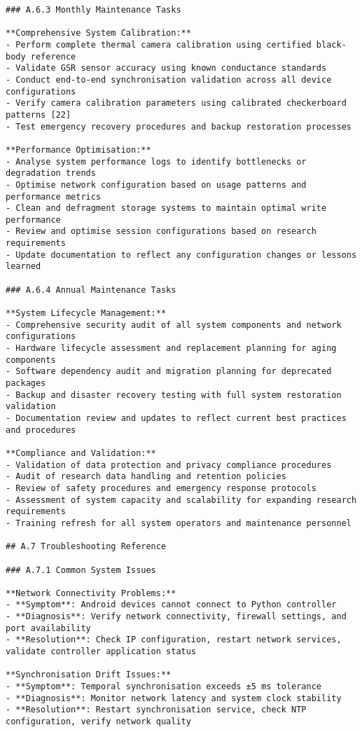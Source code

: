 \begin{verbatim}
### A.6.3 Monthly Maintenance Tasks

**Comprehensive System Calibration:**
- Perform complete thermal camera calibration using certified black-body reference
- Validate GSR sensor accuracy using known conductance standards
- Conduct end-to-end synchronisation validation across all device configurations
- Verify camera calibration parameters using calibrated checkerboard patterns [22]
- Test emergency recovery procedures and backup restoration processes

**Performance Optimisation:**
- Analyse system performance logs to identify bottlenecks or degradation trends
- Optimise network configuration based on usage patterns and performance metrics
- Clean and defragment storage systems to maintain optimal write performance
- Review and optimise session configurations based on research requirements
- Update documentation to reflect any configuration changes or lessons learned

### A.6.4 Annual Maintenance Tasks

**System Lifecycle Management:**
- Comprehensive security audit of all system components and network configurations
- Hardware lifecycle assessment and replacement planning for aging components
- Software dependency audit and migration planning for deprecated packages
- Backup and disaster recovery testing with full system restoration validation
- Documentation review and updates to reflect current best practices and procedures

**Compliance and Validation:**
- Validation of data protection and privacy compliance procedures
- Audit of research data handling and retention policies
- Review of safety procedures and emergency response protocols
- Assessment of system capacity and scalability for expanding research requirements
- Training refresh for all system operators and maintenance personnel

## A.7 Troubleshooting Reference

### A.7.1 Common System Issues

**Network Connectivity Problems:**
- **Symptom**: Android devices cannot connect to Python controller
- **Diagnosis**: Verify network connectivity, firewall settings, and port availability
- **Resolution**: Check IP configuration, restart network services, validate controller application status

**Synchronisation Drift Issues:**
- **Symptom**: Temporal synchronisation exceeds ±5 ms tolerance
- **Diagnosis**: Monitor network latency and system clock stability
- **Resolution**: Restart synchronisation service, check NTP configuration, verify network quality


\end{verbatim}
